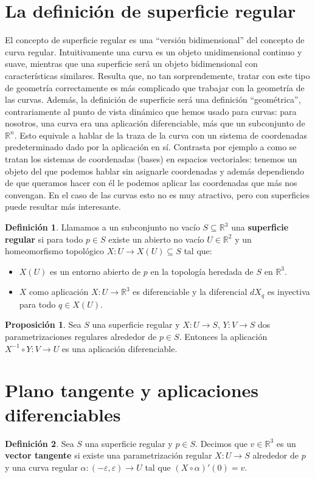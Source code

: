 \documentclass{article}
\theoremstyle{definition}
\newtheorem{prop}{Proposición}
\newtheorem{define}{Definición}
\newcommand{\reales}{\mathbb{R}}
\begin{document}
\section{La definición de superficie regular}
El concepto de superficie regular es una ``versión bidimensional'' del concepto de curva regular. Intuitivamente una curva es un objeto unidimensional continuo y suave, mientras que una superficie será un objeto bidimensional con características similares. Resulta que, no tan sorprendemente, tratar con este tipo de geometría correctamente es más complicado que trabajar con la geometría de las curvas. Además, la definición de superficie será una definición ``geométrica'', contrariamente al punto de vista dinámico que hemos usado para curvas: para nosotros, una curva era una aplicación diferenciable, más que un subconjunto de $\reales^n$. Esto equivale a hablar de la traza de la curva con un sistema de coordenadas predeterminado dado por la aplicación en sí. Contrasta por ejemplo a como se tratan los sistemas de coordenadas (bases) en espacios vectoriales: tenemos un objeto del que podemos hablar sin asignarle coordenadas y además dependiendo de que queramos hacer con él le podemos aplicar las coordenadas que más nos convengan. En el caso de las curvas esto no es muy atractivo, pero con superficies puede resultar más interesante.

\begin{define}
	Llamamos a un subconjunto no vacío $S \subseteq \reales^3$ una \textbf{superficie regular} si para todo $p \in S$ existe un abierto no vacío $U \in \reales^2$ y un homeomorfismo topológico $X: U \rightarrow X(U) \subseteq S$ tal que:
	\begin{itemize}
		\item
		$X(U)$ es un entorno abierto de $p$ en la topología heredada de $S$ en $\reales^3$.
		\item
		$X$ como aplicación $X: U \rightarrow \reales^{3}$ es diferenciable y la diferencial $dX_q$ es inyectiva para todo $q \in X(U)$.
	\end{itemize}
\end{define}

\begin{prop}
	Sea $S$ una superficie regular y $X: U \rightarrow S$, $Y: V \rightarrow S$ dos parametrizaciones regulares alrededor de $p \in S$. Entonces la aplicación $X^{-1} \circ Y : V \rightarrow U$ es una aplicación diferenciable.
\end{prop}

\section{Plano tangente y aplicaciones diferenciables}
\begin{define}
	Sea $S$ una superficie regular y $p \in S$. Decimos que $v \in \reales^3$ es un \textbf{vector tangente} si existe una parametrización regular $X: U \rightarrow S$ alrededor de $p$ y una curva regular $\alpha: (-\varepsilon, \varepsilon) \rightarrow U$ tal que $(X \circ \alpha)' (0) = v$.
\end{define}
\end{document}
